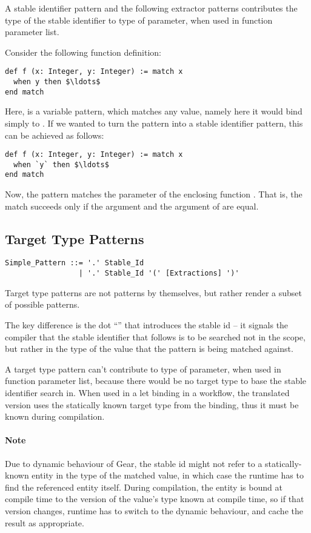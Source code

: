 A stable identifier pattern and the following extractor patterns contributes the type of the stable identifier to type of parameter, when used in function parameter list. 

\example Consider the following function definition:
\begin{lstlisting}
def f (x: Integer, y: Integer) := match x
  when y then $\ldots$
end match
\end{lstlisting}
Here,  is a variable pattern, which matches any value, namely here it would bind simply to . If we wanted to turn the pattern into a stable identifier pattern, this can be achieved as follows:
\begin{lstlisting}
def f (x: Integer, y: Integer) := match x
  when `y` then $\ldots$
end match
\end{lstlisting}
Now, the pattern matches the  parameter of the enclosing function . That is, the match succeeds only if the  argument and the  argument of  are equal. 





\subsection{Target Type Patterns}
\label{sec:target-type-patterns}

\syntax\begin{lstlisting}
Simple_Pattern ::= '.' Stable_Id
                 | '.' Stable_Id '(' [Extractions] ')'
\end{lstlisting}

Target type patterns are not patterns by themselves, but rather render a subset of possible patterns. 

The key difference is the dot ``'' that introduces the stable id -- it signals the compiler that the stable identifier that follows is to be searched not in the scope, but rather in the type of the value that the pattern is being matched against. 

A target type pattern can't contribute to type of parameter, when used in function parameter list, because there would be no target type to base the stable identifier search in. When used in a let binding in a workflow, the translated version uses the statically known target type from the binding, thus it must be known during compilation. 

\paragraph{Note}
Due to dynamic behaviour of Gear, the stable id might not refer to a statically-known entity in the type of the matched value, in which case the runtime has to find the referenced entity itself. During compilation, the entity is bound at compile time to the version of the value's type known at compile time, so if that version changes, runtime has to switch to the dynamic behaviour, and cache the result as appropriate. 






